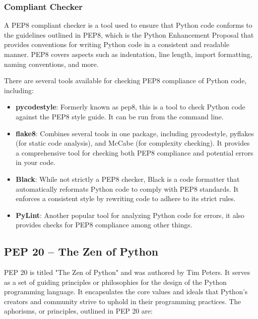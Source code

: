 \subsubsection{Compliant Checker}
A PEP8 compliant checker is a tool used to ensure that Python code conforms to the guidelines outlined in PEP8, which is the Python Enhancement Proposal that provides conventions for writing Python code in a consistent and readable manner. PEP8 covers aspects such as indentation, line length, import formatting, naming conventions, and more.

There are several tools available for checking PEP8 compliance of Python code, including:

\begin{itemize}
    \item \textbf{pycodestyle}: Formerly known as pep8, this is a tool to check Python code against the PEP8 style guide. It can be run from the command line.
    
    \item \textbf{flake8}: Combines several tools in one package, including pycodestyle, pyflakes (for static code analysis), and McCabe (for complexity checking). It provides a comprehensive tool for checking both PEP8 compliance and potential errors in your code.
    
    \item \textbf{Black}: While not strictly a PEP8 checker, Black is a code formatter that automatically reformats Python code to comply with PEP8 standards. It enforces a consistent style by rewriting code to adhere to its strict rules.
    
    \item \textbf{PyLint}: Another popular tool for analyzing Python code for errors, it also provides checks for PEP8 compliance among other things.
\end{itemize}

\newpage
\subsection{PEP 20 – The Zen of Python}

PEP 20 is titled "The Zen of Python" and was authored by Tim Peters. It serves as a set of guiding principles or philosophies for the design of the Python programming language. It encapsulates the core values and ideals that Python's creators and community strive to uphold in their programming practices. The aphorisms, or principles, outlined in PEP 20 are:\\

